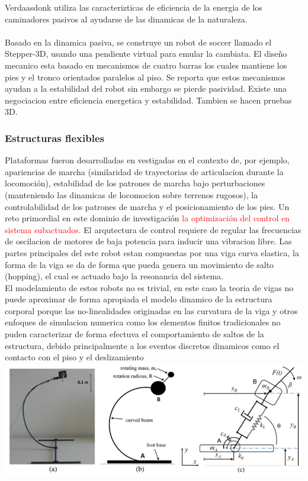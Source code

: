 \documentclass[10pt,onecolumn,twoside,letterpaper]{article}
\begin{document}
\cite{Verdaasdonk2009} Verdaasdonk utiliza las caracterizticas de eficiencia de la energia de los caminadores pasivos al ayudarse de las dinamicas de la naturaleza.\\
\href{run:/home/jackmaster/Downloads/Doc Thesis/Walkers/[2009 B W Verdaasdonk and H F J M Koopman and F C T van der Helm] Art Energy efficient walking with central pattern generators: from passive dynamic walking to biologically inspired control.pdf}{
}\cite{Verdaasdonk2009}\\
Basado en la dinamica pasiva, se construye un robot de soccer llamado el Stepper-3D, usando una pendiente virtual para emular la cambiata. El dise\~no mecanico esta basado en mecanismos de cuatro barras los cuales mantiene los pies y el tronco orientados paralelos al piso. Se reporta que estos mecanismos ayudan a la estabilidad del robot sin embargo se pierde pasividad. Existe una negociacion entre eficiencia energetica y estabilidad. Tambien se hacen pruebas 3D.\cite{Dong2009}
\subsubsection{Estructuras flexibles}
Plataformas fueron desarrolladas en vestigadas en el contexto de, por ejemplo, apariencias de marcha (similaridad de trayectorias de articulacion durante la locomoci\'on), estabilidad de los patrones de marcha bajo perturbaciones (manteniendo las dinamicas de locomocion sobre terrenos rugosos), la controlabilidad de los patrones de marcha y el posicionamiento de los pies. Un reto primordial en este dominio de investigaci\'on \textcolor{red}{la optimizaci\'on del control en sistema subactuados.} El arqutectura de control requiere de regular las frecuencias de oscilacion de motores de baja potencia para inducir una vibracion libre. Las partes principales del este robot estan compuestas por una viga curva elastica, la forma de la viga se da de forma que pueda genera un movimiento de salto (hopping), el cual es actuado bajo la resonancia del sistema.\cite{Reis2014}\\
El modelamiento de estos robots no es trivial, en este caso la teoria de vigas no puede aproximar de forma apropiada el modelo dinamico de la estructura corporal porque las no-linealidades originadas en las curvatura de la viga y otros enfoques de simulacion numerica como los elementos finitos tradicionales no puden caracterizar de forma efectuva el comportamiento de saltos de la estructura, debido principalmente a los eventos discretos dinamicos como el contacto con el piso y el deslizamiento\cite{Reis2014}\\
\includegraphics[scale=0.4]{../../images/CurvedBeamIida.png}\cite{Reis2014}\\
\cite{Yu2014}
\end{document}
